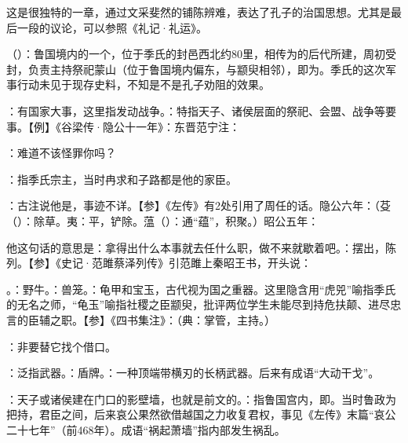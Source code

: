 {
这是很独特的一章，通过文采斐然的铺陈辨难，表达了孔子的治国思想。尤其是最后一段的议论，可以参照《礼记·礼运》。
\begin{lyitemize}
\item {}（）：鲁国境内的一个，位于季氏的封邑西北约80里，相传为的后代所建，周初受封，负责主持祭祀蒙山（位于鲁国境内偏东，与颛臾相邻），即为。季氏的这次军事行动未见于现存史料，不知是不是孔子劝阻的效果。
\item {}：有国家大事，这里指发动战争。：特指天子、诸侯层面的祭祀、会盟、战争等要事。【例】《谷梁传·隐公十一年》：东晋范宁注：
\item {}：难道不该怪罪你吗？
\item {}：指季氏宗主，当时冉求和子路都是他的家臣。
\item {}：古注说他是，事迹不详。【参】《左传》有2处引用了周任的话。隐公六年：（芟（）：除草。夷：平，铲除。蕰（）：通“蕴”，积聚。）昭公五年：

他这句话的意思是：拿得出什么本事就去任什么职，做不来就歇着吧。：摆出，陈列。【参】《史记·范雎蔡泽列传》引范雎上秦昭王书，开头说：

\item {}。：野牛。：兽笼。：龟甲和宝玉，古代视为国之重器。这里隐含用“虎兕”喻指季氏的无名之师，“龟玉”喻指社稷之臣颛臾，批评两位学生未能尽到持危扶颠、进尽忠言的臣辅之职。【参】《四书集注》：（典：掌管，主持。）
\item {}：非要替它找个借口。
\item {}：泛指武器。：盾牌。：一种顶端带横刃的长柄武器。后来有成语“大动干戈”。

\item {}：天子或诸侯建在门口的影壁墙，也就是前文的。：指鲁国宫内，即。当时鲁政为把持，君臣之间，后来哀公果然欲借越国之力收复君权，事见《左传》末篇“哀公二十七年”（前468年）。成语“祸起萧墙”指内部发生祸乱。
\end{lyitemize}
}
{}


